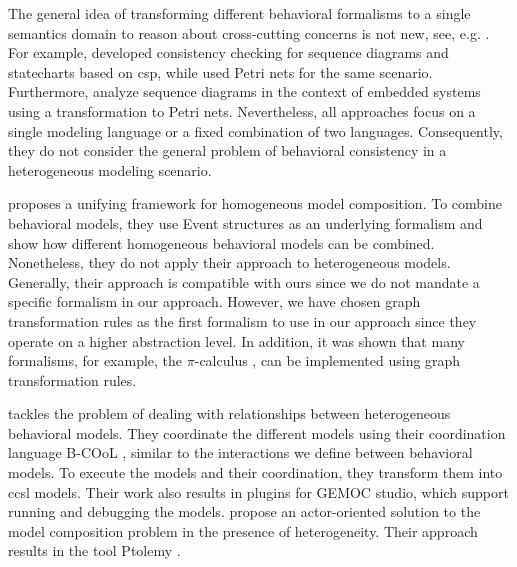 \documentclass{jot}
\begin{document}
The general idea of transforming different behavioral formalisms to a single semantics domain to reason about cross-cutting concerns is not new, see, e.g. \cite{engelsMethodologySpecifyingAnalyzing2001}.
For example, \cite{kusterExplicitBehavioralConsistency2003} developed consistency checking for sequence diagrams and statecharts based on \gls*{csp}, while \cite{yaoConsistencyCheckingUML2006} used Petri nets for the same scenario.
Furthermore, \cite{cunhaFormalVerificationUML2011} analyze sequence diagrams in the context of embedded systems using a transformation to Petri nets.
Nevertheless, all approaches focus on a single modeling language or a fixed combination of two languages.
Consequently, they do not consider the general problem of behavioral consistency in a heterogeneous modeling scenario.

\cite{kienzleUnifyingFrameworkHomogeneous2019} proposes a unifying framework for homogeneous model composition.
To combine behavioral models, they use Event structures \cite{winskelEventStructures1987} as an underlying formalism and show how different homogeneous behavioral models can be combined.
Nonetheless, they do not apply their approach to heterogeneous models.
Generally, their approach is compatible with ours since we do not mandate a specific formalism in our approach.
However, we have chosen graph transformation rules as the first formalism to use in our approach since they operate on a higher abstraction level.
In addition, it was shown that many formalisms, for example, the $\pi$-calculus \cite{gadducciGraphRewritingPcalculus2007}, can be implemented using graph transformation rules.

\cite{deantoniModelingBehavioralSemantics2016} tackles the problem of dealing with relationships between heterogeneous behavioral models.
They coordinate the different models using their coordination language B-COoL \cite{varalarsenBCoolBehavioralCoordination2016}, similar to the interactions we define between behavioral models.
To execute the models and their coordination, they transform them into \gls*{ccsl} models.  
Their work also results in plugins for GEMOC studio, which support running and debugging the models.
\cite{ekerTamingHeterogeneityPtolemy2003, leeDisciplinedHeterogeneousModeling2010} propose an actor-oriented solution to the model composition problem in the presence of heterogeneity.
Their approach results in the tool Ptolemy \cite{ptolemaeusSystemDesignModeling2014}.
\end{document}

